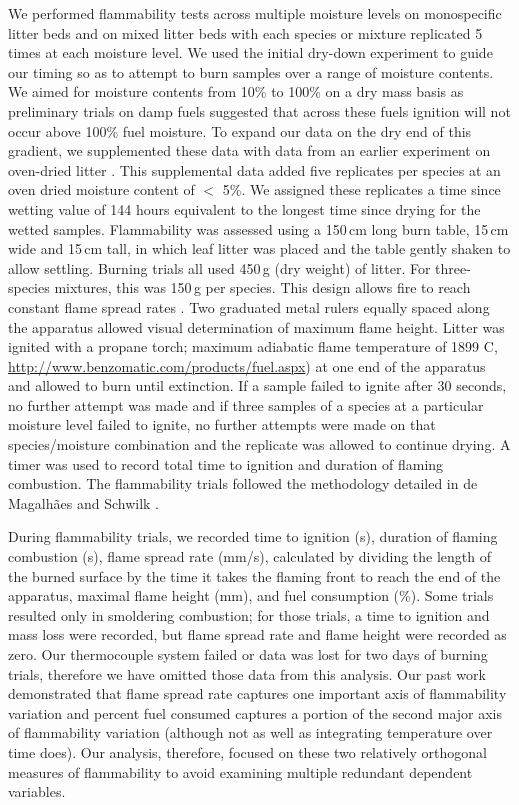\documentclass[letterpaper,12pt]{article}
\begin{document}
We performed flammability tests across multiple moisture levels on monospecific
litter beds and on mixed litter beds with each species or mixture replicated 5
times at each moisture level. We used the initial dry-down experiment to guide
our timing so as to attempt to burn samples over a range of moisture contents.
We aimed for moisture contents from 10\% to 100\% on a dry mass basis as
preliminary trials on damp fuels suggested that across these fuels ignition
will not occur above 100\% fuel moisture. To expand our data on the dry end of
this gradient, we supplemented these data with data from an earlier experiment
on oven-dried litter \citep{Magalhaes+Schwilk-2012}. This supplemental data
added five replicates per species at an oven dried moisture content of $<$ 5\%.
We assigned these replicates a time since wetting value of 144 hours equivalent
to the longest time since drying for the wetted samples. Flammability was
assessed using a 150\,cm long burn table, 15\,cm wide and 15\,cm tall, in which
leaf litter was placed and the table gently shaken to allow settling. Burning
trials all used 450\,g (dry weight) of litter. For three-species mixtures, this
was 150\,g per species. This design allows fire to reach constant flame spread
rates \citep{Magalhaes+Schwilk-2012}. Two graduated metal rulers equally spaced
along the apparatus allowed visual determination of maximum flame height.
Litter was ignited with a propane torch; maximum adiabatic flame temperature of
1899 C, \url{http://www.benzomatic.com/products/fuel.aspx}) at one end of the
apparatus and allowed to burn until extinction. If a sample failed to ignite
after 30 seconds, no further attempt was made and if three samples of a species
at a particular moisture level failed to ignite, no further attempts were made
on that species/moisture combination and the replicate was allowed to continue
drying. A timer was used to record total time to ignition and duration of
flaming combustion. The flammability trials followed the methodology detailed
in de Magalhães and Schwilk \citep{Magalhaes+Schwilk-2012}.
 
During flammability trials, we recorded time to ignition (s), duration of
flaming combustion (s), flame spread rate (mm/s), calculated by dividing the
length of the burned surface by the time it takes the flaming front to reach
the end of the apparatus, maximal flame height (mm), and fuel consumption (\%).
Some trials resulted only in smoldering combustion; for those trials, a time to
ignition and mass loss were recorded, but flame spread rate and flame height
were recorded as zero. Our thermocouple system failed or data was lost for two
days of burning trials, therefore we have omitted those data from this
analysis. Our past work \citep{Magalhaes+Schwilk-2012} demonstrated that flame
spread rate captures one important axis of flammability variation
\citep{Schwilk-2015, Pausas+Keeley+etal-2017} and percent fuel consumed
captures a portion of the second major axis of flammability variation (although
not as well as integrating temperature over time does). Our analysis,
therefore, focused on these two relatively orthogonal measures of flammability
to avoid examining multiple redundant dependent variables.
\end{document}
